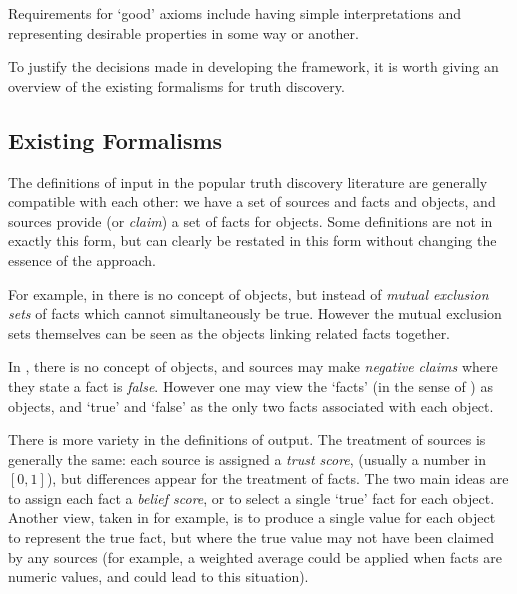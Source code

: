 \documentclass[../main.tex]{subfiles}
\begin{document}
Requirements for `good' axioms include having simple interpretations and
representing desirable properties in some way or another.

To justify the decisions made in developing the framework, it is worth giving
an overview of the existing formalisms for truth discovery.

\subsection{Existing Formalisms}

The definitions of input in the popular truth discovery literature
\cite{li_survey, gupta_han_survey, pasternack, galland, zhang_qi_tang} are
generally compatible with each other: we have a set of sources and facts and
objects\footnotemark{}, and sources provide (or \emph{claim}) a set of facts
for objects. Some definitions are not in exactly this form, but can clearly be
restated in this form without changing the essence of the approach.


For example, in \cite{pasternack} there is no concept of objects, but instead
of \emph{mutual exclusion sets} of facts which cannot simultaneously be true.
However the mutual exclusion sets themselves can be seen as the objects linking
related facts together.

In \cite{galland}, there is no concept of objects, and sources may make
\emph{negative claims} where they state a fact is \emph{false}. However one may
view the `facts' (in the sense of \cite{galland}) as objects, and `true' and
`false' as the only two facts associated with each object.

There is more variety in the definitions of output. The treatment of sources is
generally the same: each source is assigned a \emph{trust score}, (usually a
number in $[0, 1]$), but differences appear for the treatment of facts. The two
main ideas are to assign each fact a \emph{belief score}, or to select a single
`true' fact for each object. Another view, taken in \cite{li_conflicts} for
example, is to produce a single value for each object to represent the true
fact, but where the true value may not have been claimed by any sources (for
example, a weighted average could be applied when facts are numeric values, and
could lead to this situation).
\end{document}
